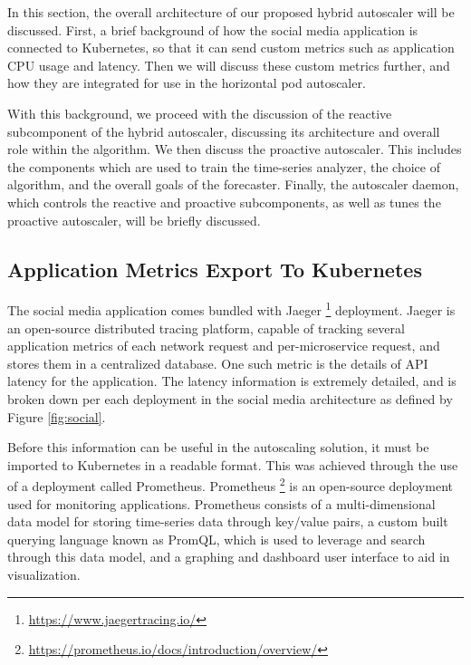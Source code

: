 
In this section, the overall architecture of our proposed hybrid autoscaler will be discussed. First, a brief background of how the social media application is connected to Kubernetes, so that it can send custom metrics such as application CPU usage and latency. Then we will discuss these custom metrics further, and how they are integrated for use in the horizontal pod autoscaler.\par

With this background, we proceed with the discussion of the reactive subcomponent of the hybrid autoscaler, discussing its architecture and overall role within the algorithm. We then discuss the proactive autoscaler. This includes the components which are used to train the time-series analyzer, the choice of algorithm, and the overall goals of the forecaster. Finally, the autoscaler daemon, which controls the reactive and proactive subcomponents, as well as tunes the proactive autoscaler, will be briefly discussed.\par

\subsection{Application Metrics Export To Kubernetes}
\label{subsec:metrics-export}

The social media application comes bundled with Jaeger \footnote{\url{https://www.jaegertracing.io/}} deployment. Jaeger is an open-source distributed tracing platform, capable of tracking several application metrics of each network request and per-microservice request, and stores them in a centralized database. One such metric is the details of API latency for the application. The latency information is extremely detailed, and is broken down per each deployment in the social media architecture as defined by Figure \ref{fig:social}.\par

Before this information can be useful in the autoscaling solution, it must be imported to Kubernetes in a readable format. This was achieved through the use of a deployment called Prometheus. Prometheus \footnote{\url{https://prometheus.io/docs/introduction/overview/}} is an open-source deployment used for monitoring applications. Prometheus consists of a multi-dimensional data model for storing time-series data through key/value pairs, a custom built querying language known as PromQL, which is used to leverage and search through this data model, and a graphing and dashboard user interface to aid in visualization.\par

